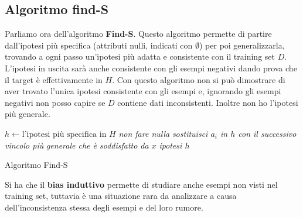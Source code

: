 \subsection{Algoritmo find-S}
Parliamo ora dell'algoritmo \textbf{Find-S}. Questo algoritmo permette di
partire dall'ipotesi più specifica (attributi nulli, indicati con
$\emptyset$) per poi generalizzarla, 
trovando a ogni passo un'ipotesi più adatta e consistente con il training
set $D$. L'ipotesi in uscita sarà anche consistente con gli esempi negativi
dando prova che il target è effettivamente in $H$. Con questo algoritmo non si
può dimostrare di aver trovato l'unica ipotesi consistente con gli esempi e,
ignorando gli esempi negativi non posso capire se $D$ contiene dati
inconsistenti. Inoltre non ho l'ipotesi più generale.
\begin{algorithm}[H]
  \begin{algorithmic}
    \State $h\gets \mbox{l'ipotesi più specifica in } H$
    \State \textit{non fare nulla}
    \Else
    \State \textit{sostituisci $a_i$ in $h$ con il successivo vincolo più}
    \State \textit{generale che è soddisfatto da $x$}
    \EndIf
    \EndFor
    \EndFor
    \Return \textit{ipotesi $h$}
    \EndFunction
  \end{algorithmic}
  \caption{Algoritmo Find-S}
\end{algorithm}
Si ha che il \textbf{bias induttivo} permette di studiare anche esempi non
visti nel training set, tuttavia è una situazione rara da analizzare a causa
dell'inconsistenza stessa degli esempi e del loro rumore.
